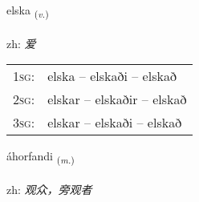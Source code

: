 \documentclass[frontgrid, backgrid]{flacards}\usepackage[]{graphicx}\usepackage[]{color}
\begin{document}
{elska \small{\textsubscript{(\textit{v.})}} \\[1ex] %
\textphonetic{[ɛlska]} \\
zh: \emph{爱} \\  [2ex]
\renewcommand*{\arraystretch}{0.8}
\begin{tabular}{p{1cm}l}
\textsc{1sg}: & elska -- elskaði -- elskað \\ 
\textsc{2sg}: & elskar -- elskaðir -- elskað \\ 
\textsc{3sg}: & elskar -- elskaði -- elskað \\ 
\end{tabular}
}

\renewcommand{\flhead}{\vskip5pt \fboxsep=0pt {\small\bfseries\footnotesize Nafnorð | 名词}}
\renewcommand{\fcfoot}{\vskip5pt \fboxsep=0pt \hspace{2pt}{\small\bfseries\footnotesize 2K}}

\renewcommand{\blhead}{\vskip5pt {\small\bfseries\footnotesize Nafnorð | 名词 }}
\renewcommand{\bcfoot}{\vskip5pt \hspace{2pt}{\small\bfseries\footnotesize 2K}}


{áhorfandi \small{\textsubscript{(\textit{m.})}} \\[1ex] %
\textphonetic{[auːhɔrvantɪ]} \\
zh: \emph{观众，旁观者} \\  [2ex]
\renewcommand*{\arraystretch}{0.8}
}

\renewcommand{\flhead}{\vskip5pt \fboxsep=0pt {\small\bfseries\footnotesize Nafnorð | 名词}}
\renewcommand{\fcfoot}{\vskip5pt \fboxsep=0pt \hspace{2pt}{\small\bfseries\footnotesize 2K}}
\end{document}
